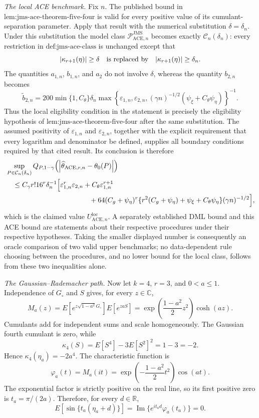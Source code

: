 \emph{The local ACE benchmark.}
Fix \(n\).  The published bound in \(\text{lem:jms-ace-theorem-five-four}\) is valid for every positive value of its cumulant-separation parameter.  Apply that result with the numerical substitution \(\delta=\delta_n\).  Under this substitution the model class \(\mathcal P_{\mathrm{ACE},n}^{\mathrm{JMS}}\) becomes exactly \(\mathcal C_n(\delta_n)\): every restriction in \(\text{def:jms-ace-class}\) is unchanged except that
\[
 |\kappa_{r+1}(\eta)|\geq\delta
 \quad\hbox{is replaced by}\quad
 |\kappa_{r+1}(\eta)|\geq\delta_n.
\]
The quantities \(a_{1,n}\), \(b_{1,n}\), and \(a_2\) do not involve \(\delta\), whereas the quantity \(b_{2,n}\) becomes
\[
 \widetilde b_{2,n}
 =200\min\{1,C_{\theta}\}\delta_n
 \max\!\left\{
   \varepsilon_{1,n},\varepsilon_{2,n},
   (\gamma n)^{-1/2}(\psi_{\xi}+C_{\theta}\psi_{\eta})
 \right\}^{-1}.
\]
Thus the local eligibility condition in the statement is precisely the eligibility hypothesis of \(\text{lem:jms-ace-theorem-five-four}\) after the same substitution.  The assumed positivity of \(\varepsilon_{1,n}\) and \(\varepsilon_{2,n}\), together with the explicit requirement that every logarithm and denominator be defined, supplies all boundary conditions required by that cited result.  Its conclusion is therefore
\[
\begin{aligned}
 &\sup_{P\in\mathcal C_n(\delta_n)}
 Q_{P,1-\gamma}
 \!\left(\left|\widehat\theta_{\mathrm{ACE},r,n}-\theta_0(P)\right|\right)\\
 &\quad\le
 C_{\gamma}r!16^r\delta_n^{-1}
 \Bigl[
   \varepsilon_{1,n}^r\varepsilon_{2,n}
   +C_{\theta}\varepsilon_{1,n}^{r+1}\\
 &\hspace{42mm}
   +64(C_g+\psi_{\eta})^r
    \{r^2(C_g+\psi_{\eta})+\psi_{\xi}+C_{\theta}\psi_{\eta}\}
    (\gamma n)^{-1/2}
 \Bigr],
\end{aligned}
\]
which is the claimed value \(U_{\mathrm{ACE},n}^{\mathrm{loc}}\).  A separately established DML bound and this ACE bound are statements about their respective procedures under their respective hypotheses.  Taking the smaller displayed number is consequently an oracle comparison of two valid upper benchmarks; no data-dependent rule choosing between the procedures, and no lower bound for the local class, follows from these two inequalities alone.

\emph{The Gaussian--Rademacher path.}
Now let \(k=4\), \(r=3\), and \(0<a\leq1\).  Independence of \(G_{\circ}\) and \(S\) gives, for every \(z\in\mathbb C\),
\[
 M_a(z)
 =E[e^{z\sqrt{1-a^2}G_{\circ}}]E[e^{zaS}]
 =\exp\!\left(\frac{1-a^2}{2}z^2\right)\cosh(az).
\]
Cumulants add for independent sums and scale homogeneously.  The Gaussian fourth cumulant is zero, while
\[
 \kappa_4(S)=E[S^4]-3E[S^2]^2=1-3=-2.
\]
Hence \(\kappa_4(\eta_a)=-2a^4\).  The characteristic function is
\[
 \varphi_a(t)=M_a(it)
 =\exp\!\left(-\frac{1-a^2}{2}t^2\right)\cos(at).
\]
The exponential factor is strictly positive on the real line, so its first positive zero is \(t_a=\pi/(2a)\).  Therefore, for every \(d\in\mathbb R\),
\[
 E[\sin\{t_a(\eta_a+d)\}]
 =\operatorname{Im}\{e^{it_ad}\varphi_a(t_a)\}=0.
\]


